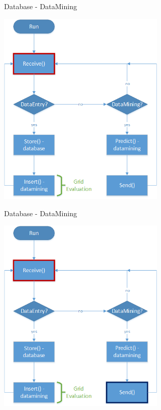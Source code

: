 	\begin{frame}{Database - DataMining}
		\begin{center}
	\includegraphics[height=0.64\textwidth, width=0.6\textwidth]{images/datamining_flow2.png}
	\end{center}
	\end{frame}
	
	\begin{frame}{Database - DataMining}
		\begin{center}
	\includegraphics[height=0.64\textwidth, width=0.6\textwidth]{images/datamining_flow3.png}
	\end{center}
	\end{frame}
